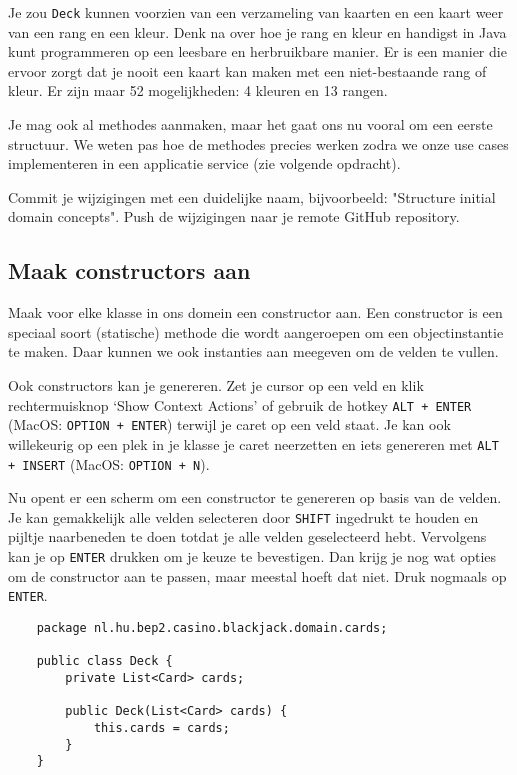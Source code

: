 Je zou \texttt{Deck} kunnen voorzien van een verzameling van kaarten 
en een kaart weer van een rang en een kleur. Denk na over hoe je rang en kleur en 
handigst in Java kunt programmeren op een leesbare en herbruikbare manier.
Er is een manier die ervoor zorgt dat je nooit een kaart kan maken met een niet-bestaande 
rang of kleur. Er zijn maar 52 mogelijkheden: 4 kleuren en 13 rangen.

Je mag ook al methodes aanmaken, maar het gaat ons nu vooral om een eerste structuur.
We weten pas hoe de methodes precies werken zodra we onze use cases implementeren 
in een applicatie service (zie volgende opdracht).

Commit je wijzigingen met een duidelijke naam, 
bijvoorbeeld: "Structure initial domain concepts". 
Push de wijzigingen naar je remote GitHub repository.

\subsection{Maak constructors aan}
Maak voor elke klasse in ons domein een constructor aan.
Een constructor is een speciaal soort (statische) methode die wordt aangeroepen
om een objectinstantie te maken. Daar kunnen we ook instanties aan meegeven om 
de velden te vullen.

Ook constructors kan je genereren. Zet je cursor op een veld en klik 
rechtermuisknop `Show Context Actions' of gebruik de hotkey \texttt{ALT + ENTER} 
(MacOS: \texttt{OPTION + ENTER}) terwijl je caret op een veld staat. 
Je kan ook willekeurig op een plek in je klasse je caret neerzetten en iets genereren 
met \texttt{ALT + INSERT} (MacOS: \texttt{OPTION + N}).

Nu opent er een scherm om een constructor te genereren op basis van de velden. Je kan 
gemakkelijk alle velden selecteren door \texttt{SHIFT} ingedrukt te houden en 
pijltje naarbeneden te doen totdat je alle velden geselecteerd hebt. Vervolgens kan je 
op \texttt{ENTER} drukken om je keuze te bevestigen. Dan krijg je nog wat opties om de 
constructor aan te passen, maar meestal hoeft dat niet. Druk nogmaals op \texttt{ENTER}.

\begin{verbatim}
    package nl.hu.bep2.casino.blackjack.domain.cards;

    public class Deck {
        private List<Card> cards;

        public Deck(List<Card> cards) {
            this.cards = cards;
        }
    }
\end{verbatim}

